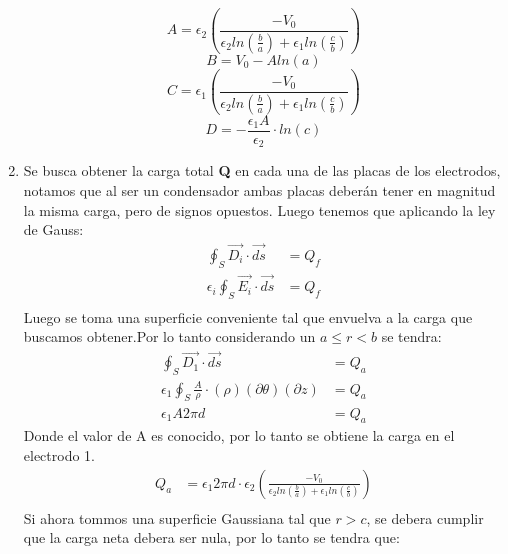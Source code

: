 \documentclass[
  11pt,
  letterpaper,
   addpoints,
  ]{exam}
\begin{document}
\begin{questions}
\begin{solution}
\begin{enumerate}
            \begin{equation}
            A= \epsilon_{2}\left(\frac{-V_{0} }{\epsilon_{2}ln(\frac{b}{a}) + \epsilon_{1}ln(\frac{c}{b})}\right)
            \end{equation}
            \begin{equation}
            B = V_{0} - Aln(a)
            \end{equation}
            \begin{equation}
            C = \epsilon_{1}\left(\frac{-V_{0}}{\epsilon_{2}ln(\frac{b}{a}) + \epsilon_{1}ln(\frac{c}{b})}\right)
            \end{equation}
            \begin{equation}
            D=-\frac{\epsilon_{1}A}{\epsilon_{2}}\cdot ln(c)
            \end{equation}
        \item Se busca obtener la carga total \textbf{Q} en cada una de las placas de los electrodos, notamos que al ser un condensador ambas placas deberán tener en magnitud la misma carga, pero de signos opuestos. Luego tenemos que aplicando la ley de Gauss:
        \begin{align}
            \oint_{S} \vec{D_{i}} \cdot \vec{ds} &= Q_f\\
        \epsilon_{i} \oint_{S} \vec{E_{i}} \cdot \vec{ds} &= Q_f\\
        \end{align}
        Luego se toma una superficie conveniente tal que envuelva a la carga que buscamos obtener.Por lo tanto considerando un $a \leq r <b$ se tendra:
        \begin{align}
            \oint_{S} \vec{D_{1}} \cdot \vec{ds} &= Q_{a}\\  
            \epsilon_{1} \oint_{S} \frac{A}{\rho} \cdot (\rho) (\partial \theta) (\partial z) &= Q_{a}\\
            \epsilon_{1} A 2 \pi d &= Q_{a}
        \end{align}
        Donde el valor de A es conocido, por lo tanto se obtiene la carga en el electrodo 1.
        \begin{align}
            Q_{a} &= \epsilon_{1}  2 \pi d \cdot \epsilon_{2}\left(\frac{-V_{0} }{\epsilon_{2}ln(\frac{b}{a}) + \epsilon_{1}ln(\frac{c}{b})}\right)\\
        \end{align}
        Si ahora tommos una superficie Gaussiana tal que $ r > c$, se debera cumplir que la carga neta debera ser nula, por lo tanto se tendra que:

\end{enumerate}
\end{solution}
\end{questions}
\end{document}
